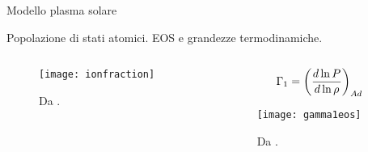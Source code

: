 \documentclass[10pt,xcolor={usenames},fleqn,mathserif,serif]{beamer}
\begin{document}
\begin{frame}{Modello plasma solare}

\begin{block}{Popolazione di stati atomici. EOS e grandezze termodinamiche.}

\begin{columns}

\begin{column}{0.5\textwidth}

\begin{figure}[!ht]
        \texttt{[image: ionfraction]}
        \caption{Da \cite{basu2008helioseismology}.}
\end{figure}%


\end{column}

\begin{column}{0.5\textwidth}

\[\Gamma_1=\left(\frac{d \ln{P}}{d \ln{\rho}}\right)_{Ad}\]

\begin{figure}[!ht]
        \texttt{[image: gamma1eos]}
        \caption{Da \cite{trampedach2006synoptic}.}
\end{figure}

\end{column}

\end{columns}

\end{block}

\end{frame}
\end{document}
